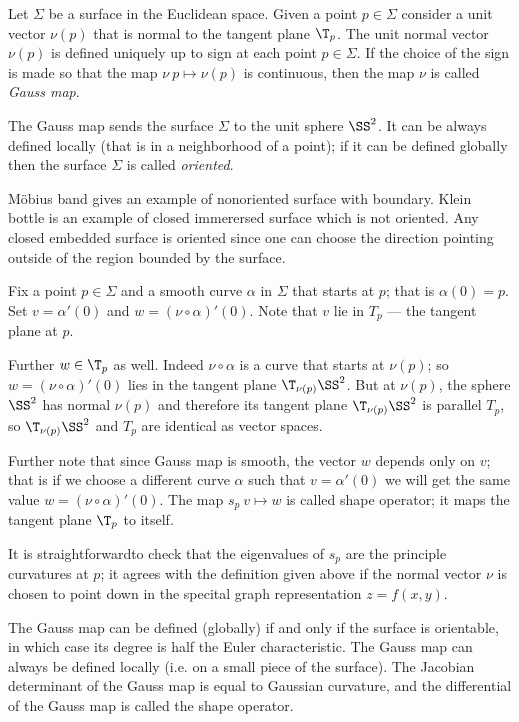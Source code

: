 Let $\Sigma$ be a surface in the Euclidean space.
Given a point $p\in\Sigma$ consider a unit vector $\nu(p)$ that is normal to the tangent plane $\T_p$. 
The unit normal vector $\nu(p)$ is defined uniquely up to sign at each point $p\in \Sigma$.
If the choice of the sign is made so that the map $\nu\:p\mapsto \nu(p)$ is continuous,
then the map $\nu$ is called \emph{Gauss map}.

The Gauss map sends the surface $\Sigma$ to the unit sphere $\SS^2$.
It can be always defined locally (that is in a neighborhood of a point);
if it can be defined globally then the surface $\Sigma$ is called \emph{oriented}.

M\"obius band gives an example of nonoriented surface with boundary.
Klein bottle is an example of closed immerersed surface which is not oriented.
Any closed embedded surface is oriented since one can choose the  direction pointing outside of the region bounded by the surface.

Fix a point $p\in \Sigma$ and a smooth curve $\alpha$ in $\Sigma$ that starts at $p$;
that is $\alpha(0)=p$.
Set  $v=\alpha'(0)$ and $w=(\nu\circ\alpha)'(0)$.
Note that $v$ lie in $T_p$ --- the tangent plane at $p$.

Further $w\in \T_p$ as well.
Indeed $\nu\circ\alpha$ is a curve that starts at $\nu(p)$;
so $w=(\nu\circ\alpha)'(0)$ lies in the tangent plane $\T_{\nu(p)}\SS^2$.
But at $\nu(p)$, the sphere $\SS^2$ has normal $\nu(p)$ and therefore its tangent plane $\T_{\nu(p)}\SS^2$ is parallel $T_p$, so $\T_{\nu(p)}\SS^2$ and $T_p$ are identical as vector spaces.

Further note that since Gauss map is smooth,
the vector $w$ depends only on $v$;
that is if we choose a different curve $\alpha$ such that $v=\alpha'(0)$ we will get the same value $w=(\nu\circ\alpha)'(0)$.
The map $s_p\:v\mapsto w$ is called shape operator;
it maps the tangent plane $\T_p$ to itself.

It is straightforwardto check that the eigenvalues of $s_p$ are the principle curvatures at $p$; it agrees with the definition given above if the normal vector $\nu$ is chosen to point down in the specital graph representation $z=f(x,y)$.







The Gauss map can be defined (globally) if and only if the surface is orientable, in which case its degree is half the Euler characteristic. The Gauss map can always be defined locally (i.e. on a small piece of the surface). The Jacobian determinant of the Gauss map is equal to Gaussian curvature, and the differential of the Gauss map is called the shape operator. 


















